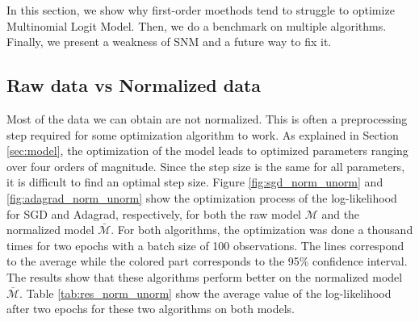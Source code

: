 \documentclass[conference]{IEEEtran}
\begin{document}
In this section, we show why first-order moethods tend to struggle to optimize Multinomial Logit Model. Then, we do a benchmark on multiple algorithms. Finally, we present a weakness of SNM and a future way to fix it.

\subsection{Raw data vs Normalized data}
\label{sec:norm_unorm}

Most of the data we can obtain are not normalized. This is often a preprocessing step required for some optimization algorithm to work. As explained in Section \ref{sec:model}, the optimization of the model leads to optimized parameters ranging over four orders of magnitude. Since the step size is the same for all parameters, it is difficult to find an optimal step size. Figure \ref{fig:sgd_norm_unorm} and \ref{fig:adagrad_norm_unorm} show the optimization process of the log-likelihood for SGD and Adagrad, respectively, for both the raw model $\mathcal{M}$ and the normalized model $\bar{\mathcal{M}}$. For both algorithms, the optimization was done a thousand times for two epochs with a batch size of 100 observations. The lines correspond to the average while the colored part corresponds to the 95\% confidence interval. The results show that these algorithms perform better on the normalized model $\bar{\mathcal{M}}$. Table \ref{tab:res_norm_unorm} show the average value of the log-likelihood after two epochs for these two algorithms on both models.
\end{document}
